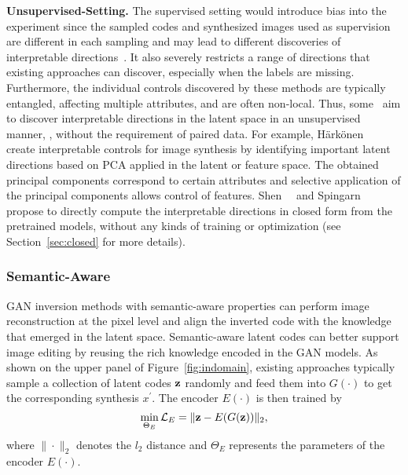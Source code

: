\noindent\textbf{Unsupervised-Setting.} 
The supervised setting would introduce bias into the experiment since the sampled codes and synthesized images used as supervision are different in each sampling and may lead to different discoveries of interpretable directions~\cite{shen2021closedform}. 
It also severely restricts a range of directions that existing approaches can discover, especially when the labels are missing. 
Furthermore, the individual controls discovered by these methods are typically entangled, affecting multiple attributes, and are often non-local.
Thus, some~\cite{voynov2020latent,lu2020discovery,eric2020GANSpace,cherepkov2020navigating} aim to discover interpretable directions in the latent space in an unsupervised manner, \ie, without the requirement of paired data.
For example, Härkönen~\etal~\cite{eric2020GANSpace} create interpretable controls for image synthesis by identifying important latent directions based on PCA applied in the latent or feature space. The obtained principal components correspond to certain attributes and selective application of the principal components allows control of features.
Shen~\etal~\cite{shen2021closedform} and Spingarn~\etal~\cite{spingarn2021steerability} propose to directly compute the interpretable directions in closed form from the pretrained models, without any kinds of training or optimization (see Section~\ref{sec:closed} for more details).

\subsubsection{Semantic-Aware}
\label{sec:semantic-aware}

GAN inversion methods with semantic-aware properties can perform image reconstruction at the pixel level and align the inverted code with the knowledge that emerged in the latent space. 
Semantic-aware latent codes can better support image editing by reusing the rich knowledge encoded in the GAN models.
As shown on the upper panel of Figure~\ref{fig:indomain}, existing approaches typically sample a collection of latent codes $\mathbf{z}$ randomly and feed them into $G(\cdot)$ to get the corresponding synthesis $x^{\prime}$. 
The encoder $E(\cdot)$ is then trained by
\begin{equation}
\min_{\Theta_{E}} \mathcal{L}_{E}=\|\mathbf{z}-E(G(\mathbf{z}))\|_{2},
\end{equation}
where $\|\cdot\|_{2}$ denotes the $l_{2}$ distance and $\Theta_{E}$ represents the parameters of the encoder $E(\cdot)$.

